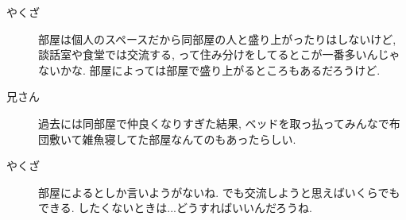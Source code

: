 \documentclass[10pt,b5jsbook,dvips,dvipdfmx,openany]{jsbook}
\theoremstyle{definition}
\begin{document}
\begin{multicols}{2}
\begin{description}
		\item[やくざ]部屋は個人のスペースだから同部屋の人と盛り上がったりはしないけど, 談話室や食堂では交流する, って住み分けをしてるとこが一番多いんじゃないかな. 部屋によっては部屋で盛り上がるところもあるだろうけど. 
		\item[兄さん]過去には同部屋で仲良くなりすぎた結果, ベッドを取っ払ってみんなで布団敷いて雑魚寝してた部屋なんてのもあったらしい. 
		\item[やくざ]部屋によるとしか言いようがないね. でも交流しようと思えばいくらでもできる. したくないときは...どうすればいいんだろうね. 
		\end{description}



\end{multicols}
\end{document}
